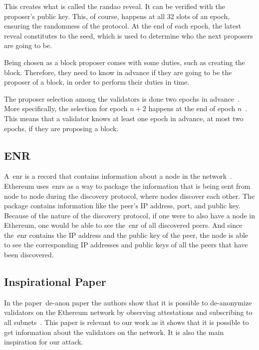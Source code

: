 This creates what is called the \gls{randao} reveal.
It can be verified with the proposer's public key.
This, of course, happens at all 32 slots of an epoch, ensuring the randomness of the protocol.
At the end of each epoch, the latest reveal constitutes to the seed, which is used to determine who the next proposers are going to be.


Being chosen as a block proposer comes with some duties, such as creating the block.
Therefore, they need to know in advance if they are going to be the proposer of a block, in order to perform their duties in time.

The proposer selection among the validators is done two epochs in advance~\cite{random-selection}.
More specifically, the selection for epoch $n+2$ happens at the end of epoch $n$~\cite{upgrading-ethereum-randomness}.
This means that a validator knows at least one epoch in advance, at most two epochs, if they are proposing a block.


\subsection{ENR}\label{subsec:enr}
A~\gls{enr} is a record that contains information about a node in the network~\cite{EIP-778:Ethereum-Node-Records}.
Ethereum uses~\glspl{enr} as a way
to package the information that is being sent from node to node during the discovery protocol,
where nodes discover each other.
The package contains information like the peer's IP address, port, and public key.
Because of the nature of the discovery protocol, if one were to also have a node in Ethereum,
one would be able to see the~\gls{enr} of all discovered peers.
And since the~\gls{enr} contains the IP address and the public key of the peer,
the node is able
to see the corresponding IP addresses and public keys of all the peers that have been discovered.


\subsection{Inspirational Paper}\label{subsec:inspirational-papers}

In the paper~\gls{de-anon paper} the authors show that it is possible to de-anonymize validators on the Ethereum network by observing attestations and subscribing to all subnets~\cite{heimbach2024deanonymizingethereumvalidatorsp2p}.
This paper is relevant to our work as it shows that it is possible to get information about the validators on the network.
It is also the main inspiration for our attack.


